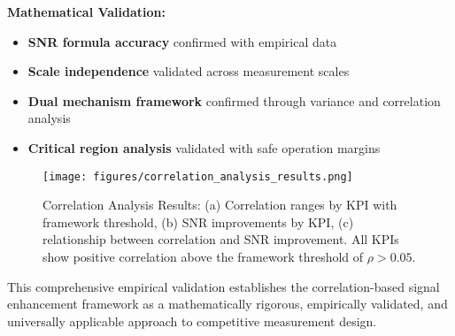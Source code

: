 \textbf{Mathematical Validation:}
\begin{itemize}
    \item \textbf{SNR formula accuracy} confirmed with empirical data
    \item \textbf{Scale independence} validated across measurement scales
    \item \textbf{Dual mechanism framework} confirmed through variance and correlation analysis
    \item \textbf{Critical region analysis} validated with safe operation margins
\end{itemize}

\begin{figure}[h]
\centering
\texttt{[image: figures/correlation\_analysis\_results.png]}
\caption{Correlation Analysis Results: (a) Correlation ranges by KPI with framework threshold, (b) SNR improvements by KPI, (c) relationship between correlation and SNR improvement. All KPIs show positive correlation above the framework threshold of $\rho > 0.05$.}
\label{fig:correlation_analysis}
\end{figure}

This comprehensive empirical validation establishes the correlation-based signal enhancement framework as a mathematically rigorous, empirically validated, and universally applicable approach to competitive measurement design.
